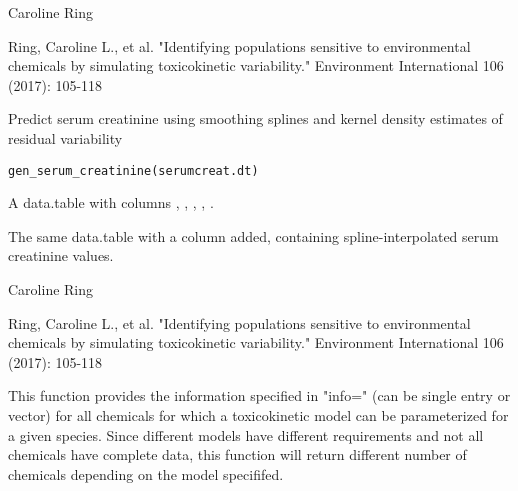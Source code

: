 \documentclass[a4paper]{book}
\begin{document}
%
\begin{Author}\relax
Caroline Ring
\end{Author}
%
\begin{References}\relax
Ring, Caroline L., et al. "Identifying populations sensitive to
environmental chemicals by simulating toxicokinetic variability."
Environment International 106 (2017): 105-118
\end{References}
%
\begin{Description}\relax
Predict serum creatinine using smoothing splines and kernel density estimates of residual variability
\end{Description}
%
\begin{Usage}
\begin{verbatim}
gen_serum_creatinine(serumcreat.dt)
\end{verbatim}
\end{Usage}
%
\begin{Arguments}
\begin{ldescription}
\item[\code{serumcreat.dt}] A data.table with columns , , 
, , .
\end{ldescription}
\end{Arguments}
%
\begin{Value}
The same data.table with a  column added, containing 
spline-interpolated serum creatinine values.
\end{Value}
%
\begin{Author}\relax
Caroline Ring
\end{Author}
%
\begin{References}\relax
Ring, Caroline L., et al. "Identifying populations sensitive to 
environmental chemicals by simulating toxicokinetic variability." Environment 
International 106 (2017): 105-118
\end{References}
%
\begin{Description}\relax
This function provides the information specified in "info=" (can be single entry
or vector) for all chemicals for which a toxicokinetic model can be
parameterized for a given species. Since different models have different 
requirements and not all chemicals have complete data, this function will 
return different number of chemicals depending on the model specififed.
\end{Description}
\end{document}
